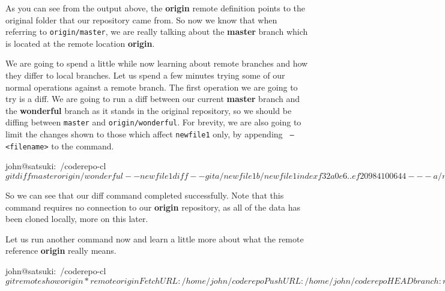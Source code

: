 
As you can see from the output above, the \textbf{origin} remote definition points to the original folder that our repository came from.
So now we know that when referring to \texttt{origin/master}, we are really talking about the \textbf{master} branch which is located at the remote location \textbf{origin}.

We are going to spend a little while now learning about remote branches and how they differ to local branches.
Let us spend a few minutes trying some of our normal operations against a remote branch.
The first operation we are going to try is a diff.
We are going to run a diff between our current \textbf{master} branch and the \textbf{wonderful} branch as it stands in the original repository, so we should be diffing between \texttt{master} and \texttt{origin/wonderful}.
For brevity, we are also going to limit the changes shown to those which affect \texttt{newfile1} only, by appending \texttt{ -- <filename>} to the command.

\begin{code}
john@satsuki:~/coderepo-cl$ git diff master origin/wonderful -- newfile1
diff --git a/newfile1 b/newfile1
index f32a0e6..ef20984 100644
--- a/newfile1
+++ b/newfile1
@@ -1,3 +1,2 @@
 A new file
-and some more awesome changes
-Some mega important changes
+and some more changes
john@satsuki:~/coderepo-cl$
\end{code}

So we can see that our diff command completed successfully.
Note that this command requires no connection to our \textbf{origin} repository, as all of the data has been cloned locally, more on this later.

Let us run another command now and learn a little more about what the remote reference \textbf{origin} really means.

\begin{code}
john@satsuki:~/coderepo-cl$ git remote show origin
* remote origin
  Fetch URL: /home/john/coderepo
  Push  URL: /home/john/coderepo
  HEAD branch: master
  Remote branches:
    master    tracked
    wonderful tracked
    zaney     tracked
  Local branch configured for 'git pull':
    master merges with remote master
  Local ref configured for 'git push':
    master pushes to master (up to date)
john@satsuki:~/coderepo-cl$
\end{code}

